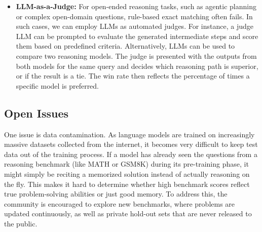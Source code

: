 \begin{itemize}
\noindent where $\hat{a}_i^j$ is the final answer extracted from the $j$-th reasoning path. The final accuracy is then obtained by comparing $\hat{a}_{\text{maj}}$ with the ground truth:
\begin{eqnarray}
\text{Cons}@k & = & \frac{1}{N} \sum_{i=1}^N \mathbbm{1}(\hat{a}_i^{\text{maj}} = a^*_i).
\end{eqnarray}

Cons@$k$ provides a practical evaluation approach for real-world reasoning systems, as it measures whether a model can consistently arrive at the correct answer. Compared with Pass@$k$, which evaluates whether at least one sampled response is correct, Cons@$k$ emphasizes the reliability of reasoning by favoring answers that are consistently supported across multiple sampled reasoning paths.

\item \vspace{0.3em} \textbf{LLM-as-a-Judge:} For open-ended reasoning tasks, such as agentic planning or complex open-domain questions, rule-based exact matching often fails. In such cases, we can employ LLMs as automated judges. For instance, a judge LLM can be prompted to evaluate the generated intermediate steps and score them based on predefined criteria. Alternatively, LLMs can be used to compare two reasoning models. The judge is presented with the outputs from both models for the same query and decides which reasoning path is superior, or if the result is a tie. The win rate then reflects the percentage of times a specific model is preferred.
\end{itemize}
\vspace{0.5em}

\subsection{Open Issues}

One issue is data contamination. As language models are trained on increasingly massive datasets collected from the internet, it becomes very difficult to keep test data out of the training process. If a model has already seen the questions from a reasoning benchmark (like MATH or GSM8K) during its pre-training phase, it might simply be reciting a memorized solution instead of actually reasoning on the fly. This makes it hard to determine whether high benchmark scores reflect true problem-solving abilities or just good memory. To address this, the community is encouraged to explore new benchmarks, where problems are updated continuously, as well as private hold-out sets that are never released to the public.

